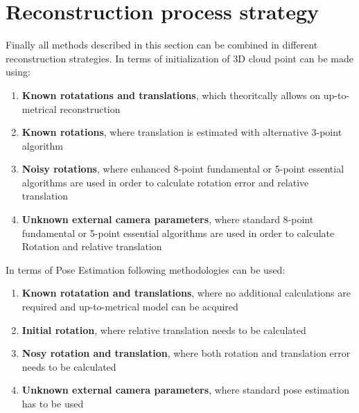 \section{Reconstruction process strategy}
Finally all methods described in this section can be combined in different reconstruction strategies. In terms of initialization of 3D cloud point can be made using: 
\begin{enumerate} 
\item \textbf{Known rotatations and translations}, which theoritcally allows on up-to-metrical reconstruction
\item \textbf{Known rotations}, where translation is estimated with alternative 3-point algorithm
\item \textbf{Noisy rotations}, where enhanced 8-point fundamental or 5-point essential algorithms are used in order to calculate rotation error and relative translation 
\item \textbf{Unknown external camera parameters}, where standard 8-point fundamental or 5-point essential algorithms are used in order to calculate Rotation and relative translation
\end{enumerate}
In terms of Pose Estimation following methodologies can be used:
\begin{enumerate}
\item \textbf{Known rotatation and translations}, where no additional calculations are required and up-to-metrical model can be acquired
\item \textbf{Initial rotation}, where relative translation needs to be calculated
\item \textbf{Nosy rotation and translation}, where both rotation and translation error needs to be calculated
\item \textbf{Unknown external camera parameters}, where standard pose estimation has to be used
\end{enumerate}


